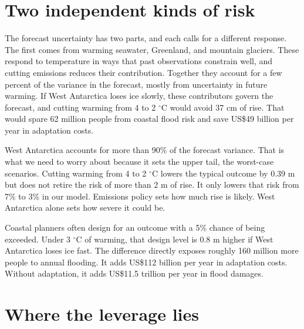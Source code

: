 \documentclass[11pt]{article}
\begin{document}
\section{Two independent kinds of risk}

The forecast uncertainty has two parts, and each calls for a different response. The first comes from warming seawater, Greenland, and mountain glaciers. These respond to temperature in ways that past observations constrain well, and cutting emissions reduces their contribution. Together they account for a few percent of the variance in the forecast, mostly from uncertainty in future warming. If West Antarctica loses ice slowly, these contributors govern the forecast, and cutting warming from 4 to 2 $^\circ$C would avoid 37 cm of rise. That would spare 62 million people from coastal flood risk and save US\$49 billion per year in adaptation costs.

West Antarctica accounts for more than 90\% of the forecast variance. That is what we need to worry about because it sets the upper tail, the worst-case scenarios. Cutting warming from 4 to 2 $^\circ$C lowers the typical outcome by 0.39 m but does not retire the risk of more than 2 m of rise. It only lowers that risk from 7\% to 3\% in our model. Emissions policy sets how much rise is likely. West Antarctica alone sets how severe it could be.

Coastal planners often design for an outcome with a 5\% chance of being exceeded. Under 3 $^\circ$C of warming, that design level is 0.8 m higher if West Antarctica loses ice fast. The difference directly exposes roughly 160 million more people to annual flooding. It adds US\$112 billion per year in adaptation costs. Without adaptation, it adds US\$11.5 trillion per year in flood damages.


\section{Where the leverage lies}
\end{document}
